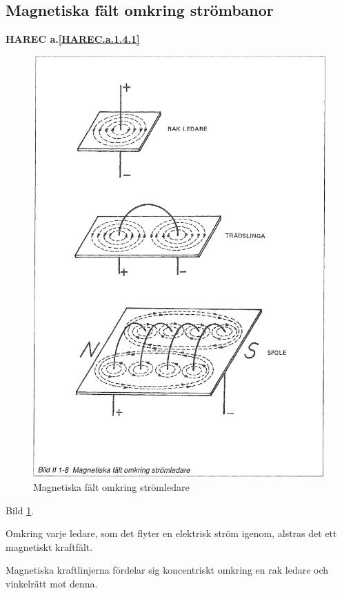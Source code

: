 \subsection{Magnetiska fält omkring strömbanor}
\textbf{HAREC a.\ref{HAREC.a.1.4.1}\label{myHAREC.a.1.4.1}}

\begin{figure}
  \includegraphics[width=\textwidth]{images/bild_2_1-08}
  \caption{Magnetiska fält omkring strömledare}
  \label{fig:BildII1-8}
\end{figure}

Bild \ref{fig:BildII1-8}.

Omkring varje ledare, som det flyter en elektrisk ström igenom, alstras det ett
magnetiskt kraftfält.

Magnetiska kraftlinjerna fördelar sig koncentriskt omkring en rak ledare och
vinkelrätt mot denna.

